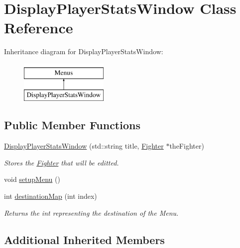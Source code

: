 \hypertarget{class_display_player_stats_window}{}\section{Display\+Player\+Stats\+Window Class Reference}
\label{class_display_player_stats_window}
Inheritance diagram for Display\+Player\+Stats\+Window\+:\begin{figure}[H]
\begin{center}
\leavevmode
\includegraphics[height=2.000000cm]{class_display_player_stats_window}
\end{center}
\end{figure}
\subsection*{Public Member Functions}
\begin{DoxyCompactItemize}
\item 
\hyperlink{class_display_player_stats_window_aea83c9776d9fe14ef35351765f333b74}{Display\+Player\+Stats\+Window} (std\+::string title, \hyperlink{class_fighter}{Fighter} $\ast$the\+Fighter)
\begin{DoxyCompactList}\small\item\em Stores the \hyperlink{class_fighter}{Fighter} that will be editted. \end{DoxyCompactList}\item 
void \hyperlink{class_display_player_stats_window_afacc32b87a4cb61bf971db00fb877cf3}{setup\+Menu} ()
\item 
\hypertarget{class_display_player_stats_window_a13a93a61f3131589e931dc6ca2cc1641}{}\label{class_display_player_stats_window_a13a93a61f3131589e931dc6ca2cc1641} 
int \hyperlink{class_display_player_stats_window_a13a93a61f3131589e931dc6ca2cc1641}{destination\+Map} (int index)
\begin{DoxyCompactList}\small\item\em Returns the int representing the destination of the Menu. \end{DoxyCompactList}\end{DoxyCompactItemize}
\subsection*{Additional Inherited Members}


